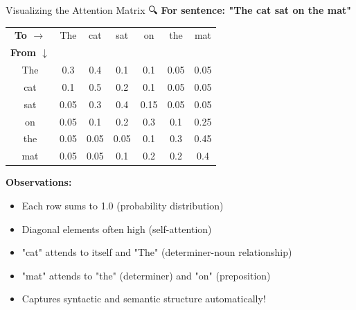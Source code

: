 \documentclass[aspectratio=169]{beamer}
\begin{document}
\begin{frame}{Visualizing the Attention Matrix 🔍}
\textbf{For sentence: "The cat sat on the mat"}

\vspace{1em}

\begin{center}
\small
\begin{tabular}{c|cccccc}
\textbf{To $\rightarrow$} & The & cat & sat & on & the & mat \\
\textbf{From $\downarrow$} & & & & & & \\
\hline
The & 0.3 & 0.4 & 0.1 & 0.1 & 0.05 & 0.05 \\
cat & 0.1 & \cellcolor{orange!80}0.5 & 0.2 & 0.1 & 0.05 & 0.05 \\
sat & 0.05 & 0.3 & \cellcolor{orange!80}0.4 & 0.15 & 0.05 & 0.05 \\
on & 0.05 & 0.1 & 0.2 & 0.3 & 0.1 & 0.25 \\
the & 0.05 & 0.05 & 0.05 & 0.1 & 0.3 & 0.45 \\
mat & 0.05 & 0.05 & 0.1 & 0.2 & 0.2 & \cellcolor{orange!80}0.4 \\
\end{tabular}
\end{center}

\vspace{1em}

\textbf{Observations:}
\begin{itemize}\setlength{\itemsep}{0pt}
    \item Each row sums to 1.0 (probability distribution)
    \item Diagonal elements often high (self-attention)
    \item "cat" attends to itself and "The" (determiner-noun relationship)
    \item "mat" attends to "the" (determiner) and "on" (preposition)
    \item Captures syntactic and semantic structure automatically!
\end{itemize}
\end{frame}
\end{document}
